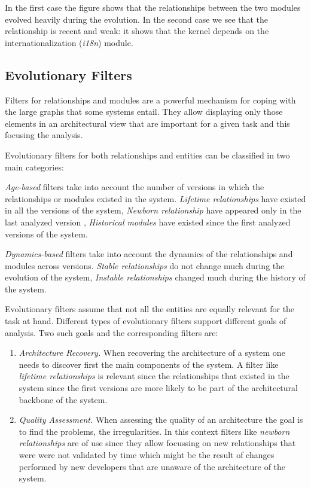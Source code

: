 \documentclass[preprint,12pt]{elsarticle}
\begin{document}
In the first case the figure shows that the relationships between the two modules evolved heavily during the evolution. In the second case we see that the relationship is recent and weak: it shows that the kernel depends on the internationalization ({\em i18n}) module. 



\subsection {Evolutionary Filters}

Filters for relationships and modules are a powerful mechanism for coping with the large graphs that some systems entail. They allow displaying only those elements in an architectural view that are important for a given task and this focusing the analysis. 

Evolutionary filters for both relationships and entities can be classified in two main categories:

\begin{description}
\item {\em Age-based} filters take into account the number of versions in which the relationships or modules existed in the system. {\em Lifetime relationships} have existed in all the versions of the system, {\em Newborn relationship} have appeared only in the last analyzed version \cite{lungu-relevo}, {\em Historical modules} have existed since the first analyzed versions of the system.
\item {\em Dynamics-based} filters take into account the dynamics of the relationships and modules across versions. {\em Stable relationships} do not change much during the evolution of the system, {\em Instable relationships} changed much during the history of the system.
\end{description}

Evolutionary filters assume that not all the entities are equally relevant for the task at hand. Different types of evolutionary filters support different goals of analysis. Two such goals and the corresponding filters are:

\begin{enumerate}
\item {\em Architecture Recovery.} When recovering the architecture of a system one needs to discover first the main components of the system. A filter like {\em lifetime relationships} is relevant since the relationships that existed in the system since the first versions are more likely to be part of the architectural backbone of the system.
\item {\em Quality Assessment.} When assessing the quality of an architecture the goal is to find the problems, the irregularities. In this context filters like {\em newborn relationships} are of use since they allow focussing on new relationships that were were not validated by time which might be the result of changes performed by new developers that are unaware of the architecture of the system. 
\end{enumerate}
\end{document}
